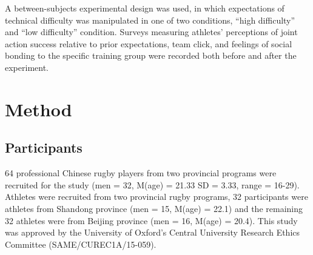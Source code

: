 A between-subjects experimental design was used, in which expectations of technical difficulty was manipulated in one of two conditions, ``high difficulty'' and ``low difficulty'' condition.  Surveys measuring athletes' perceptions of joint action success relative to prior expectations, team click, and feelings of social bonding to the specific training group were recorded both before and after the experiment.




\section{Method}


\subsection{Participants}
64 professional Chinese rugby players from two provincial programs were recruited for the study (men = 32, M(age) = 21.33 SD = 3.33, range = 16-29).  Athletes were recruited from two provincial rugby programs, 32
participants were athletes from Shandong province (men = 15, M(age) = 22.1) and the remaining 32 athletes were from Beijing province (men = 16, M(age) = 20.4).  This study was approved by the University of Oxford’s Central University Research Ethics Committee (SAME/CUREC1A/15-059).


